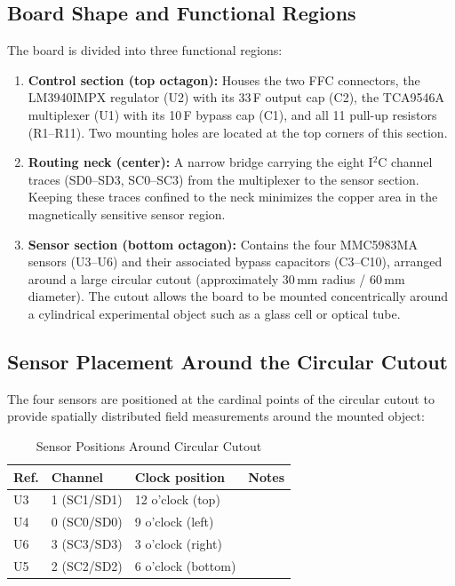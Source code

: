 \documentclass[12pt]{article}
\begin{document}
\subsection{Board Shape and Functional Regions}

The board is divided into three functional regions:

\begin{enumerate}
  \item \textbf{Control section (top octagon):} Houses the two FFC
        connectors, the LM3940IMPX regulator (U2) with its 33\,\textmu F
        output cap (C2), the TCA9546A multiplexer (U1) with its 10\,\textmu F
        bypass cap (C1), and all 11 pull-up resistors (R1--R11). Two
        mounting holes are located at the top corners of this section.

  \item \textbf{Routing neck (center):} A narrow bridge carrying the eight
        I$^2$C channel traces (SD0--SD3, SC0--SC3) from the multiplexer
        to the sensor section. Keeping these traces confined to the neck
        minimizes the copper area in the magnetically sensitive sensor
        region.

  \item \textbf{Sensor section (bottom octagon):} Contains the four
        MMC5983MA sensors (U3--U6) and their associated bypass capacitors
        (C3--C10), arranged around a large circular cutout
        (approximately 30\,mm radius / 60\,mm diameter). The cutout allows
        the board to be mounted concentrically around a cylindrical
        experimental object such as a glass cell or optical tube.
\end{enumerate}

\subsection{Sensor Placement Around the Circular Cutout}

The four sensors are positioned at the cardinal points of the circular
cutout to provide spatially distributed field measurements around the
mounted object:

\begin{table}[H]
  \centering
  \caption{Sensor Positions Around Circular Cutout}
  \begin{tabular}{llll}
    \toprule
    \textbf{Ref.} & \textbf{Channel} & \textbf{Clock position} &
    \textbf{Notes} \\
    \midrule
    U3 & 1 (SC1/SD1) & 12 o'clock (top)    & \\
    U4 & 0 (SC0/SD0) & 9 o'clock (left)    & \\
    U6 & 3 (SC3/SD3) & 3 o'clock (right)   & \\
    U5 & 2 (SC2/SD2) & 6 o'clock (bottom)  & \\
    \bottomrule
  \end{tabular}
  \label{tab:sensor_positions}
\end{table}
\end{document}

